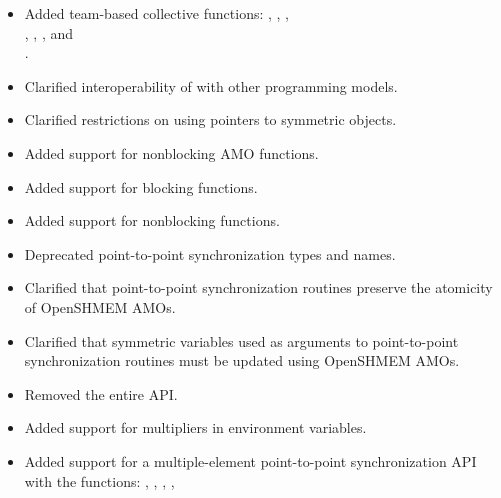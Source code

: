 \begin{itemize}
%
%
\item Added team-based collective functions: ,
  , , \\
  , , , and \\
  .
%
%
\item Clarified interoperability of \openshmem with other programming models.
%
%
\item Clarified restrictions on using pointers to symmetric objects.
%
%
\item Added support for nonblocking \ac{AMO} functions.
%
%
\item Added support for blocking  functions.
%
%
\item Added support for nonblocking  functions.
%
%
\item Deprecated point-to-point synchronization types and names.
%
%
\item Clarified that point-to-point synchronization routines preserve the
  atomicity of OpenSHMEM \acp{AMO}.
%
%
\item Clarified that symmetric variables used as  arguments to
  point-to-point synchronization routines must be updated using OpenSHMEM
  \acp{AMO}.
%
%
\item Removed the entire \openshmem \Fortran \ac{API}.
%
%
\item Added support for multipliers in 
environment variables.
%
%
\item Added support for a multiple-element point-to-point synchronization \ac{API} with
  the functions: , ,
  , ,

\end{itemize}
